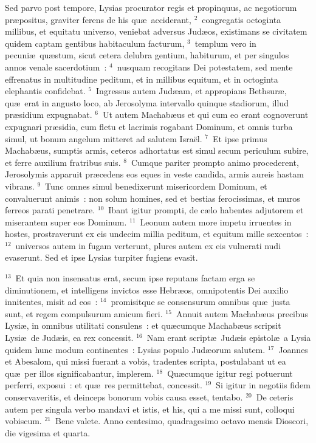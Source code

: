 \lettrine[lines=3,image=true,loversize=0.05,lraise=-0.03]{S}{}ed parvo post tempore, Lysias procurator regis et propinquus, ac negotiorum pr\ae positus, graviter ferens de his qu\ae\ acciderant,
${}^{2}$~congregatis octoginta millibus, et equitatu universo, veniebat adversus Jud\ae os, existimans se civitatem quidem captam gentibus habitaculum facturum,
${}^{3}$~templum vero in pecuni\ae\ qu\ae stum, sicut cetera delubra gentium, habiturum, et per singulos annos venale sacerdotium~:
${}^{4}$~nusquam recogitans Dei potestatem, sed mente effrenatus in multitudine peditum, et in millibus equitum, et in octoginta elephantis confidebat.
${}^{5}$~Ingressus autem Jud\ae am, et appropians Bethsur\ae , qu\ae\ erat in angusto loco, ab Jerosolyma intervallo quinque stadiorum, illud pr\ae sidium expugnabat.
${}^{6}$~Ut autem Machab\ae us et qui cum eo erant cognoverunt expugnari pr\ae sidia, cum fletu et lacrimis rogabant Dominum, et omnis turba simul, ut bonum angelum mitteret ad salutem Isra\"el.
${}^{7}$~Et ipse primus Machab\ae us, sumptis armis, ceteros adhortatus est simul secum periculum subire, et ferre auxilium fratribus suis.
${}^{8}$~Cumque pariter prompto animo procederent, Jerosolymis apparuit pr\ae cedens eos eques in veste candida, armis aureis hastam vibrans.
${}^{9}$~Tunc omnes simul benedixerunt misericordem Dominum, et convaluerunt animis~: non solum homines, sed et bestias ferocissimas, et muros ferreos parati penetrare.
${}^{10}$~Ibant igitur prompti, de c\ae lo habentes adjutorem et miserantem super eos Dominum.
${}^{11}$~Leonum autem more impetu irruentes in hostes, prostraverunt ex eis undecim millia peditum, et equitum mille sexcentos~:
${}^{12}$~universos autem in fugam verterunt, plures autem ex eis vulnerati nudi evaserunt. Sed et ipse Lysias turpiter fugiens evasit.


${}^{13}$~Et quia non insensatus erat, secum ipse reputans factam erga se diminutionem, et intelligens invictos esse Hebr\ae os, omnipotentis Dei auxilio innitentes, misit ad eos~:
${}^{14}$~promisitque se consensurum omnibus qu\ae\ justa sunt, et regem compulsurum amicum fieri.
${}^{15}$~Annuit autem Machab\ae us precibus Lysi\ae , in omnibus utilitati consulens~: et qu\ae cumque Machab\ae us scripsit Lysi\ae\ de Jud\ae is, ea rex concessit.
${}^{16}$~Nam erant script\ae\ Jud\ae is epistol\ae\ a Lysia quidem hunc modum continentes~: Lysias populo Jud\ae orum salutem.
${}^{17}$~Joannes et Abesalom, qui missi fuerant a vobis, tradentes scripta, postulabant ut ea qu\ae\ per illos significabantur, implerem.
${}^{18}$~Qu\ae cumque igitur regi potuerunt perferri, exposui~: et qu\ae\ res permittebat, concessit.
${}^{19}$~Si igitur in negotiis fidem conservaveritis, et deinceps bonorum vobis causa esset, tentabo.
${}^{20}$~De ceteris autem per singula verbo mandavi et istis, et his, qui a me missi sunt, colloqui vobiscum.
${}^{21}$~Bene valete. Anno centesimo, quadragesimo octavo mensis Dioscori, die vigesima et quarta.


